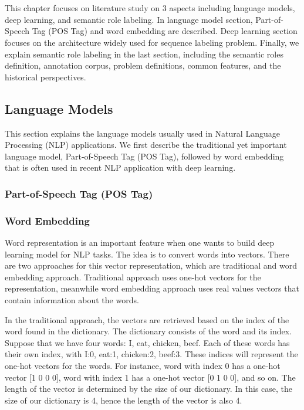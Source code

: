 \chapter{\babDua}
This chapter focuses on literature study on 3 aspects including language models, deep learning, and semantic role labeling. In language model section, Part-of-Speech Tag (POS Tag) and word embedding are described. Deep learning section focuses on the architecture widely used for sequence labeling problem. Finally, we explain semantic role labeling in the last section, including the semantic roles definition, annotation corpus, problem definitions, common features, and the historical perspectives.
\section{Language Models}
This section explains the language models usually used in Natural Language Processing (NLP) applications. We first describe the traditional yet important language model, Part-of-Speech Tag (POS Tag), followed by word embedding that is often used in recent NLP application with deep learning.

\subsection{Part-of-Speech Tag (POS Tag)}

\subsection{Word Embedding}
Word representation is an important feature when one wants to build deep learning model for NLP tasks. The idea is to convert words into vectors. There are two approaches for this vector representation, which are traditional and word embedding approach. Traditional approach uses one-hot vectors for the representation, meanwhile word embedding approach uses real values vectors that contain information about the words.

In the traditional approach, the vectors are retrieved based on the index of the word found in the dictionary. The dictionary consists of the word and its index. Suppose that we have four words: I, eat, chicken, beef. Each of these words has their own index, with I:0, eat:1, chicken:2, beef:3. These indices will represent the one-hot vectors for the words. For instance, word with index 0 has a one-hot vector [1 0 0 0], word with index 1 has a one-hot vector [0 1 0 0], and so on. The length of the vector is determined by the size of our dictionary. In this case, the size of our dictionary is 4, hence the length of the vector is also 4. 

